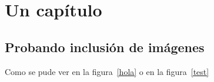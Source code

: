 \chapter{Un capítulo}

\section{Probando inclusión de imágenes}


Como se pude ver en la figura~\ref{hola} o en la figura~\ref{test}

